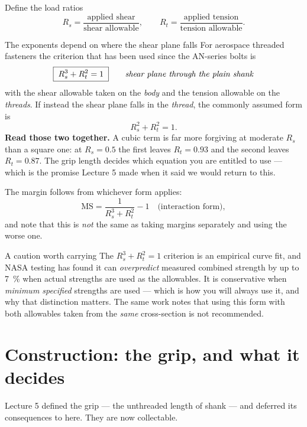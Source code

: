\documentclass[11pt,a4paper]{article}
\begin{document}
\medskip
Define the load ratios
\[
R_s=\frac{\text{applied shear}}{\text{shear allowable}},
\qquad
R_t=\frac{\text{applied tension}}{\text{tension allowable}} .
\]

\begin{keybox}{The exponents depend on where the shear plane falls}
For aerospace threaded fasteners the criterion that has been used since the AN-series bolts is
\[
\boxed{\;R_s^{3}+R_t^{2}=1\;}
\qquad\text{\emph{shear plane through the plain shank}}
\]
with the shear allowable taken on the \emph{body} and the tension allowable on the \emph{threads}.
If instead the shear plane falls in the \emph{thread}, the commonly assumed form is
\[
R_s^{2}+R_t^{2}=1 .
\]
\textbf{Read those two together.} A cubic term is far more forgiving at moderate $R_s$ than a square
one: at $R_s=0.5$ the first leaves $R_t=0.93$ and the second leaves $R_t=0.87$. The grip length
decides which equation you are entitled to use --- which is the promise Lecture 5 made when it said
we would return to this.

\medskip
The margin follows from whichever form applies:
\[
\mathrm{MS}=\frac{1}{R_s^{3}+R_t^{2}}-1 \quad\text{(interaction form)},
\]
and note that this is \emph{not} the same as taking margins separately and using the worse one.
\end{keybox}

\begin{aerobox}{A caution worth carrying}
The $R_s^3+R_t^2=1$ criterion is an empirical curve fit, and NASA testing has found it can
\emph{overpredict} measured combined strength by up to \SI{7}{\percent} when actual strengths are
used as the allowables. It is conservative when \emph{minimum specified} strengths are used ---
which is how you will always use it, and why that distinction matters. The same work notes that
using this form with both allowables taken from the \emph{same} cross-section is not recommended.
\end{aerobox}

\section{Construction: the grip, and what it decides}
\label{sec:grip6}

Lecture 5 defined the grip --- the unthreaded length of shank --- and deferred its consequences to
here. They are now collectable.
\end{document}

